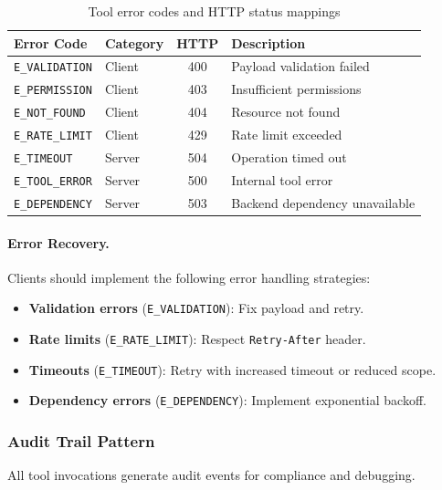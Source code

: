 \begin{table}[htbp]
    \centering
    \caption{Tool error codes and HTTP status mappings}
    \label{tab:tool-error-codes}
    \begin{tabularx}{\textwidth}{llcX}
        \toprule
        \textbf{Error Code} & \textbf{Category} & \textbf{HTTP} & \textbf{Description} \\
        \midrule
        \texttt{E\_VALIDATION} & Client & 400 & Payload validation failed \\
        \texttt{E\_PERMISSION} & Client & 403 & Insufficient permissions \\
        \texttt{E\_NOT\_FOUND} & Client & 404 & Resource not found \\
        \texttt{E\_RATE\_LIMIT} & Client & 429 & Rate limit exceeded \\
        \texttt{E\_TIMEOUT} & Server & 504 & Operation timed out \\
        \texttt{E\_TOOL\_ERROR} & Server & 500 & Internal tool error \\
        \texttt{E\_DEPENDENCY} & Server & 503 & Backend dependency unavailable \\
        \bottomrule
    \end{tabularx}
\end{table}

\paragraph{Error Recovery.}
Clients should implement the following error handling strategies:

\begin{itemize}
    \item \textbf{Validation errors} (\texttt{E\_VALIDATION}): Fix payload and retry.
    \item \textbf{Rate limits} (\texttt{E\_RATE\_LIMIT}): Respect \texttt{Retry-After} header.
    \item \textbf{Timeouts} (\texttt{E\_TIMEOUT}): Retry with increased timeout or reduced scope.
    \item \textbf{Dependency errors} (\texttt{E\_DEPENDENCY}): Implement exponential backoff.
\end{itemize}

\subsubsection{Audit Trail Pattern}

All tool invocations generate audit events for compliance and debugging.

